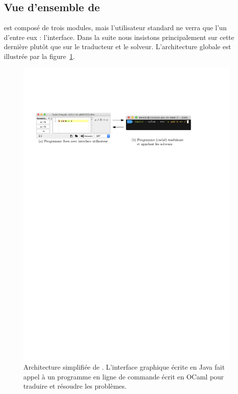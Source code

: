 \subsection{Vue d'ensemble de \touist}\label{sec:sat_interface}

\touist est composé de trois modules, mais l'utilisateur standard ne verra que l'un d'entre eux : l'interface. Dans la suite nous insistons principalement sur cette dernière plutôt que sur le traducteur et le solveur. L'architecture globale est illustrée par la figure~\ref{fig:archi-simple-touist}.

\begin{figure}[!ht] \centering
  \includegraphics[width=1\textwidth]{figures/archi-simple}
  \caption{Architecture simplifiée de \touist. L'interface graphique écrite en Java fait appel à un programme en ligne de commande écrit en OCaml pour traduire et résoudre les problèmes.} \label{fig:archi-simple-touist} 
\end{figure}

